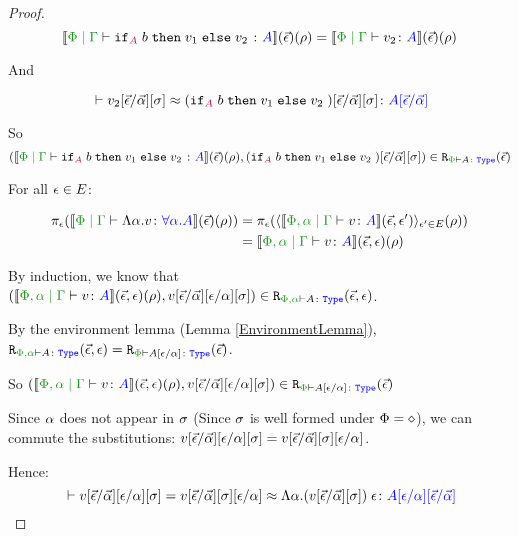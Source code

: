 \begin{framed}
\begin{proof}
            \begin{equation}
                \deno{\gpetyperelation{\pifthenelse{A}{b}{v_1}{v_2}}{A}}\fundRho = \deno{\gpetyperelation{v_2}{A}}\fundRho
            \end{equation}
            
            And
            
            \begin{equation}
               \zberelation{v_2\fundSub}{(\pifthenelse{A}{b}{v_1}{v_2})\fundSub}{A\ssub{\av}{\ev}}
            \end{equation}
            
            So
            \begin{equation}
                    \inLogRelPE{\deno{\gpetyperelation{\pifthenelse{A}{b}{v_1}{v_2}}{A}}\fundRho}{(\pifthenelse{A}{b}{v_1}{v_2})\fundSub}{A}
                \end{equation}
            
        
        \case{\vgen}
        
        For all $\epsilon\in E$:
        
        \begin{align}
            \pe(\deno{\gpetyperelation{\elam{\a}{v}}{\all{\a}{A}}}\fundRho) & = \pe(\finpr{\deno{\etyperelation{\P,\a}{\G}{v}{A}}(\ev, \e')}{\e'\in E}(\rho)) 
            \\
            & = \deno{\etyperelation{\P,\a}{\G}{v}{A}}(\ev, \e)(\rho)
        \end{align}
        
        By induction, we know that $\inLogRel{\deno{\etyperelation{\P,\a}{\G}{v}{A}}(\ev, \e)(\rho)}{v\ssub{\av}{\ev}\ssub{\a}{\e}\ssi}{\P,\a}{A}{\ev, \e}$.
        
        
        By the environment lemma (Lemma \ref{EnvironmentLemma}), $\erelates{\P, \a}{A}(\ev, \e) = \erelates{\P}{A\ssub{\a}{\e}}(\ev)$.
        
        
        So $\inLogRelPE{\deno{\etyperelation{\P,\a}{\G}{v}{A}}(\ev, \e)(\rho)}{v\ssub{\av}{\ev}\ssub{\a}{\e}\ssi}{A\ssub{\a}{\e}}$
        
        Since $\alpha$ does not appear in $\sigma$ (Since $\sigma$ is well formed under $\Phi = \diamond$), we can commute the substitutions: $v[\vec{\epsilon} / \vec{\alpha}][\epsilon / \alpha][\sigma] = v[\vec{\epsilon} / \vec{\alpha}][\sigma][\epsilon / \alpha]$.
        
        Hence: 
        \begin{equation*}
            \zberelation{v\ssub{\av}{\ev}\ssub{\a}{\e}\ssi = v\ssub{\av}{\ev}\ssi\ssub{\a}{\e}}{\eapp{\elam{\a}{(v\fundSub)}}{\e}}{A\ssub{\a}{\e}\ssub{\av}{\ev}}
        \end{equation*}
        

\end{proof}
\end{framed}
